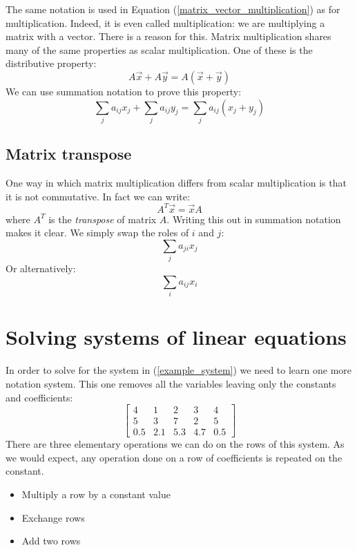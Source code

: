 \documentclass{article}
\begin{document}
The same notation is used in Equation (\ref{matrix_vector_multiplication})
as for multiplication.
Indeed, it is even called multiplication: we are multiplying a matrix with
a vector.
There is a reason for this.
Matrix multiplication shares many of the same properties as scalar multiplication.
One of these is the distributive property:
\begin{equation}
A \vec x + A \vec y = A (\vec x + \vec y)
\end{equation}
We can use summation notation to prove this property:
\begin{equation}
\sum_j a_{ij} x_j + \sum_j a_{ij} y_j = \sum_j a_{ij} (x_j + y_j)
\end{equation}

\subsection{Matrix transpose}

One way in which matrix multiplication differs from scalar multiplication
is that it is not commutative.
In fact we can write:
\begin{equation}
A^T \vec x = \vec x A
\end{equation}
where $A^T$ is the {\it transpose} of matrix $A$.
Writing this out in summation notation makes it clear.
We simply swap the roles of $i$ and $j$:
\begin{equation}
\sum_j a_{ji} x_j
\end{equation}
Or alternatively:
\begin{equation}
\sum_i a_{ij} x_i
\end{equation}

\section{Solving systems of linear equations}

In order to solve for the system in (\ref{example_system}) we need to learn
one more notation system.
This one removes all the variables leaving only the constants and coefficients:
\begin{equation}
	\left [ \begin{array}{lll|l}
			4 & 1 & 2 & 3 & 4 \\
			5 & 3 & 7 & 2 & 5 \\
			0.5 & 2.1 & 5.3 & 4.7 & 0.5
	\end{array} \right ]
\end{equation}
There are three elementary operations we can do on the rows of this system.
As we would expect,
any operation done on a row of coefficients is repeated on the constant.
\begin{itemize}
	\item Multiply a row by a constant value
	\item Exchange rows
	\item Add two rows
\end{itemize}
\end{document}
